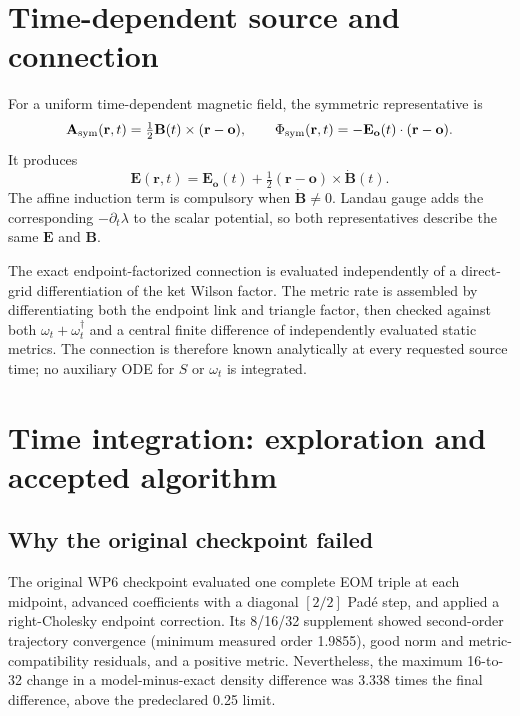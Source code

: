 \documentclass[11pt]{article}
\newcommand{\A}{\mathbf A}
\newcommand{\B}{\mathbf B}
\newcommand{\E}{\mathbf E}
\newcommand{\rvec}{\mathbf r}
\begin{document}
\section{Time-dependent source and connection}

For a uniform time-dependent magnetic field, the symmetric representative is
\begin{equation}
 \A_{\rm sym}(\rvec,t)=\tfrac12\B(t)\times(\rvec-\mathbf o),
 \qquad
 \Phi_{\rm sym}(\rvec,t)=-\E_{\mathbf o}(t)\cdot(\rvec-\mathbf o).
\end{equation}
It produces
\begin{equation}
 \E(\rvec,t)=\E_{\mathbf o}(t)
 +\tfrac12(\rvec-\mathbf o)\times\dot{\B}(t).
\end{equation}
The affine induction term is compulsory when $\dot{\B}\ne0$.  Landau gauge
adds the corresponding $-\partial_t\lambda$ to the scalar potential, so both
representatives describe the same $\E$ and $\B$.

The exact endpoint-factorized connection is evaluated independently of a
direct-grid differentiation of the ket Wilson factor.  The metric rate is
assembled by differentiating both the endpoint link and triangle factor, then
checked against both $\omega_t+\omega_t^\dagger$ and a central finite
difference of independently evaluated static metrics.  The connection is
therefore known analytically at every requested source time; no auxiliary ODE
for $S$ or $\omega_t$ is integrated.

\section{Time integration: exploration and accepted algorithm}

\subsection{Why the original checkpoint failed}

The original WP6 checkpoint evaluated one complete EOM triple at each
midpoint, advanced coefficients with a diagonal $[2/2]$ Pad\'e step, and
applied a right-Cholesky endpoint correction.  Its 8/16/32 supplement showed
second-order trajectory convergence (minimum measured order 1.9855), good
norm and metric-compatibility residuals, and a positive metric.  Nevertheless,
the maximum 16-to-32 change in a model-minus-exact density difference was
3.338 times the final difference, above the predeclared 0.25 limit.
\end{document}
